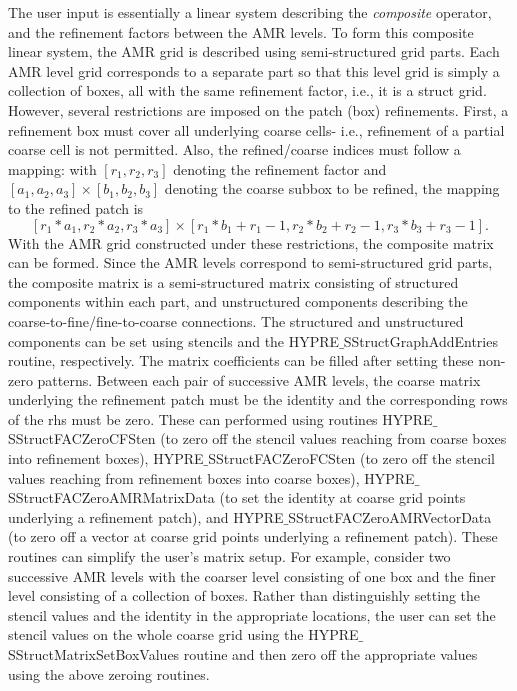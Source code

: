 The user input is essentially a linear system describing the {\it composite}
operator, and the refinement factors between the AMR levels. To form this composite linear system,
the AMR grid is described using semi-structured grid parts. Each AMR level grid corresponds to
a separate part so that this level grid is simply a collection of boxes, all with the same refinement
factor, i.e., it is a struct grid. However, several restrictions are imposed on the patch (box) refinements.
First, a refinement box must cover all underlying coarse cells- i.e., refinement of a partial coarse cell 
is not permitted. Also, the refined/coarse indices must follow a mapping: with $[r_1,r_2,r_3]$ denoting the
refinement factor and $[a_1,a_2,a_3] \times [b_1,b_2,b_3]$ denoting the coarse subbox to be refined, the
mapping to the refined patch is 
\[ [r_1*a_1,r_2*a_2,r_3*a_3] \times [r_1*b_1+ r_1-1, r_2*b_2+ r_2-1,r_3*b_3+ r_3-1]. \]
With the AMR grid constructed under these restrictions,
the composite matrix can be formed. Since the AMR levels correspond to semi-structured grid parts, the
composite matrix is a semi-structured matrix consisting of structured components within each part, and
unstructured components describing the coarse-to-fine/fine-to-coarse connections. The structured and
unstructured components can be set using stencils and the HYPRE$\_$SStructGraphAddEntries routine, respectively.
The matrix coefficients can be filled after setting these non-zero patterns. Between each pair of
successive AMR levels, the coarse matrix underlying the refinement patch must be the identity and the corresponding
rows of the rhs must be zero. These can performed using routines HYPRE$\_$SStructFACZeroCFSten (to zero off
the stencil values reaching from coarse boxes into refinement boxes), HYPRE$\_$SStructFACZeroFCSten
(to zero off the stencil values reaching from refinement boxes into coarse boxes),
HYPRE$\_$SStructFACZeroAMRMatrixData (to set the identity at coarse grid points underlying a refinement patch),
and HYPRE$\_$SStructFACZeroAMRVectorData (to zero off a vector at coarse grid points underlying a refinement patch).
These routines can simplify the user's matrix setup. For example, consider two successive AMR levels with the
coarser level consisting of one box and the finer level consisting of a collection of boxes. Rather than 
distinguishly setting the stencil values and the identity in the appropriate locations, the user can set the
stencil values on the whole coarse grid using the HYPRE$\_$SStructMatrixSetBoxValues routine and then
zero off the appropriate values using the above zeroing routines.

